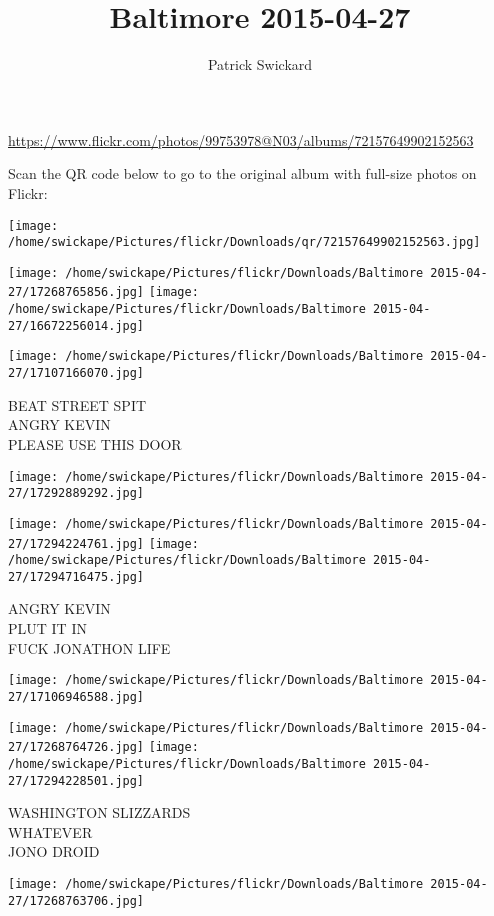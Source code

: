 \documentclass[10pt,letterpaper]{article}
\title{Baltimore 2015-04-27}
\author{Patrick Swickard}
\date{}
\begin{document}
\maketitle

\url{https://www.flickr.com/photos/99753978@N03/albums/72157649902152563}

Scan the QR code below to go to the original album with full-size photos on Flickr:

\texttt{[image: /home/swickape/Pictures/flickr/Downloads/qr/72157649902152563.jpg]}
\pagebreak

\texttt{[image: /home/swickape/Pictures/flickr/Downloads/Baltimore 2015-04-27/17268765856.jpg]}
\texttt{[image: /home/swickape/Pictures/flickr/Downloads/Baltimore 2015-04-27/16672256014.jpg]}

\texttt{[image: /home/swickape/Pictures/flickr/Downloads/Baltimore 2015-04-27/17107166070.jpg]}

BEAT STREET SPIT\\
ANGRY KEVIN\\
PLEASE USE THIS DOOR
\pagebreak

\texttt{[image: /home/swickape/Pictures/flickr/Downloads/Baltimore 2015-04-27/17292889292.jpg]}

\vspace{0.25in}
\texttt{[image: /home/swickape/Pictures/flickr/Downloads/Baltimore 2015-04-27/17294224761.jpg]}
\texttt{[image: /home/swickape/Pictures/flickr/Downloads/Baltimore 2015-04-27/17294716475.jpg]}

ANGRY KEVIN\\
PLUT IT IN\\
FUCK JONATHON LIFE
\pagebreak

\texttt{[image: /home/swickape/Pictures/flickr/Downloads/Baltimore 2015-04-27/17106946588.jpg]}

\vspace{0.25in}
\texttt{[image: /home/swickape/Pictures/flickr/Downloads/Baltimore 2015-04-27/17268764726.jpg]}
\texttt{[image: /home/swickape/Pictures/flickr/Downloads/Baltimore 2015-04-27/17294228501.jpg]}

WASHINGTON SLIZZARDS\\
WHATEVER\\
JONO DROID
\pagebreak

\texttt{[image: /home/swickape/Pictures/flickr/Downloads/Baltimore 2015-04-27/17268763706.jpg]}
\end{document}
